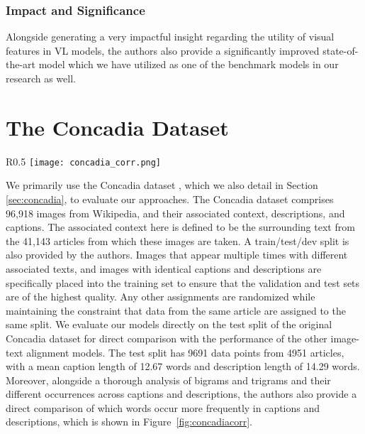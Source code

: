 \documentclass[11pt]{article}
\begin{document}
\subsubsection{Impact and Significance}
Alongside generating a very impactful insight regarding the utility of visual features in VL models, the authors also provide a significantly improved state-of-the-art model which we have utilized as one of the benchmark models in our research as well.

\section{The Concadia Dataset}

\label{sec:3}

\begin{wrapfigure}{R}{0.5\textwidth}
    \centering
    \texttt{[image: concadia\_corr.png]}
    \caption{Correlation of word frequency between captions and descriptions in the Concadia dataset (Figure 10 from \cite{kreiss2021concadia})}
    \label{fig:concadiacorr}
\end{wrapfigure}

We primarily use the Concadia dataset \cite{kreiss2021concadia}, which we also detail in Section \ref{sec:concadia}, to evaluate our approaches. The Concadia dataset comprises 96,918 images from Wikipedia, and their associated context, descriptions, and captions. The associated context here is defined to be the surrounding text from the 41,143 articles from which these images are taken. A train/test/dev split is also provided by the authors. Images that appear multiple times with different associated texts, and images with identical captions and descriptions are specifically placed into the training set to ensure that the validation and test sets are of the highest quality. Any other assignments are randomized while maintaining the constraint that data from the same article are assigned to the same split. We evaluate our models directly on the test split of the original Concadia dataset for direct comparison with the performance of the other image-text alignment models. The test split has 9691 data points from 4951 articles, with a mean caption length of 12.67 words and description length of 14.29 words. Moreover, alongside a thorough analysis of bigrams and trigrams and their different occurrences across captions and descriptions, the authors also provide a direct comparison of which words occur more frequently in captions and descriptions, which is shown in Figure~\ref{fig:concadiacorr}.
\end{document}
